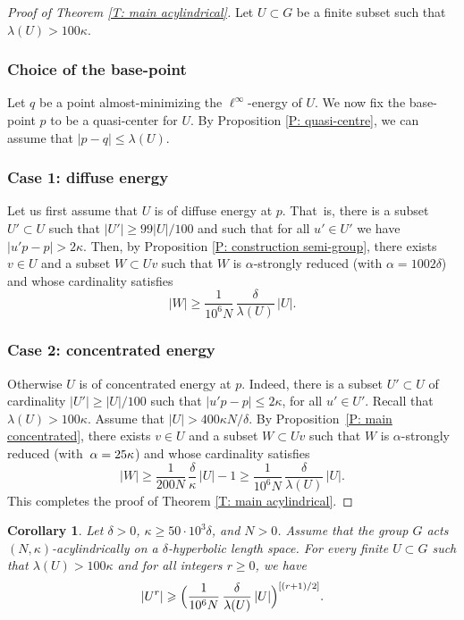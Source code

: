 \documentclass[11pt]{article}
\theoremstyle{plain}
\newtheorem{cor}[thm]{Corollary}
\theoremstyle{definition}
\begin{document}
\begin{proof}[Proof of Theorem \ref{T: main acylindrical}]
Let $U\subset G$ be a finite subset such that $\lambda(U)>100\kappa$.

\subsubsection*{Choice of the base-point} Let $q$ be a point almost-minimizing the $\ell^{\infty}$-energy of $U$. We now fix the base-point $p$ to be a quasi-center for $U$. By Proposition \ref{P: quasi-centre}, we can assume that $|p-q|\leqslant \lambda(U)$.

\subsubsection*{Case 1: diffuse energy} Let us first assume that $U$ is of diffuse energy at $p$. That~is, there is a subset $U'\subset U$ such that $|U'|\geqslant 99|U|/100$ and such that for all $u'\in U'$ we have $|u'p-p|>2\kappa$.
Then, by Proposition \ref{P: construction semi-group}, there exists $v \in U$ and a subset $W \subset Uv$ such that $W$ is $\alpha$-strongly reduced (with $\alpha = 1002\delta$) and whose cardinality satisfies
\begin{equation*}
|W| \geq \frac 1{10^6N}\,\frac \delta{\lambda(U)}\, |U|.
\end{equation*}

\subsubsection*{Case 2: concentrated energy} Otherwise $U$ is of concentrated energy at $p$. Indeed, there is a subset $U'\subset U$ of cardinality $|U'|\geqslant |U|/100$ such that $|u'p-p|\leqslant 2\kappa$, for all $u'\in U'$.
Recall that $\lambda(U) > 100\kappa$.
Assume that $|U| > 400\kappa N /\delta$.
By Proposition~\ref{P: main concentrated}, there exists $v \in U$ and a subset $W \subset Uv$ such that $W$ is $\alpha$-strongly reduced (with~$\alpha =\nobreak 25\kappa$) and whose cardinality satisfies
\begin{equation*}
|W| \geq \frac 1{200N}\,\frac \delta{\kappa}\, |U|-1 \geq \frac 1{10^6N}\,\frac \delta{\lambda(U)}\, |U|.
\end{equation*}
This completes the proof of Theorem \ref{T: main acylindrical}. \end{proof}

\begin{cor}\label{T: acylindrical}
Let $\delta >0$, $\kappa\geqslant 50\cdot 10^3\delta$, and $N>0$.
Assume that the group $G$ acts $(N,\kappa)$-acylindrically on a $\delta$-hyperbolic length space.
For every finite $U\subset G$ such that $\lambda(U)> 100\kappa$ and for all integers $r\geqslant 0$, we have
\[
|U^r|\geqslant \Bigl( \frac 1{10^6N}\,\frac \delta{\lambda(U)}\, |U| \Bigr)^{[(r+1)/2]} .
\]
\end{cor}
\end{document}

